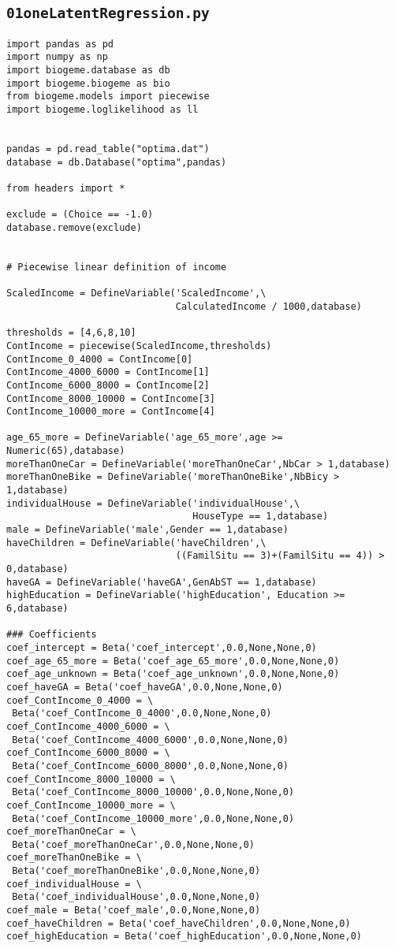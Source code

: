 \documentclass[12pt,a4paper]{article}
\begin{document}
\subsection{\lstinline$01oneLatentRegression.py$}
\label{sec:01oneLatentRegression}
\begin{lstlisting}[style=numbers]
import pandas as pd
import numpy as np
import biogeme.database as db
import biogeme.biogeme as bio
from biogeme.models import piecewise
import biogeme.loglikelihood as ll


pandas = pd.read_table("optima.dat")
database = db.Database("optima",pandas)

from headers import *

exclude = (Choice == -1.0)
database.remove(exclude)


# Piecewise linear definition of income

ScaledIncome = DefineVariable('ScaledIncome',\
                              CalculatedIncome / 1000,database)

thresholds = [4,6,8,10]
ContIncome = piecewise(ScaledIncome,thresholds)
ContIncome_0_4000 = ContIncome[0]
ContIncome_4000_6000 = ContIncome[1]
ContIncome_6000_8000 = ContIncome[2]
ContIncome_8000_10000 = ContIncome[3]
ContIncome_10000_more = ContIncome[4]

age_65_more = DefineVariable('age_65_more',age >= Numeric(65),database)
moreThanOneCar = DefineVariable('moreThanOneCar',NbCar > 1,database)
moreThanOneBike = DefineVariable('moreThanOneBike',NbBicy > 1,database)
individualHouse = DefineVariable('individualHouse',\
                                 HouseType == 1,database)
male = DefineVariable('male',Gender == 1,database)
haveChildren = DefineVariable('haveChildren',\
                              ((FamilSitu == 3)+(FamilSitu == 4)) > 0,database)
haveGA = DefineVariable('haveGA',GenAbST == 1,database)
highEducation = DefineVariable('highEducation', Education >= 6,database)

### Coefficients
coef_intercept = Beta('coef_intercept',0.0,None,None,0)
coef_age_65_more = Beta('coef_age_65_more',0.0,None,None,0)
coef_age_unknown = Beta('coef_age_unknown',0.0,None,None,0)
coef_haveGA = Beta('coef_haveGA',0.0,None,None,0)
coef_ContIncome_0_4000 = \
 Beta('coef_ContIncome_0_4000',0.0,None,None,0)
coef_ContIncome_4000_6000 = \
 Beta('coef_ContIncome_4000_6000',0.0,None,None,0)
coef_ContIncome_6000_8000 = \
 Beta('coef_ContIncome_6000_8000',0.0,None,None,0)
coef_ContIncome_8000_10000 = \
 Beta('coef_ContIncome_8000_10000',0.0,None,None,0)
coef_ContIncome_10000_more = \
 Beta('coef_ContIncome_10000_more',0.0,None,None,0)
coef_moreThanOneCar = \
 Beta('coef_moreThanOneCar',0.0,None,None,0)
coef_moreThanOneBike = \
 Beta('coef_moreThanOneBike',0.0,None,None,0)
coef_individualHouse = \
 Beta('coef_individualHouse',0.0,None,None,0)
coef_male = Beta('coef_male',0.0,None,None,0)
coef_haveChildren = Beta('coef_haveChildren',0.0,None,None,0)
coef_highEducation = Beta('coef_highEducation',0.0,None,None,0)


\end{lstlisting}
\end{document}
